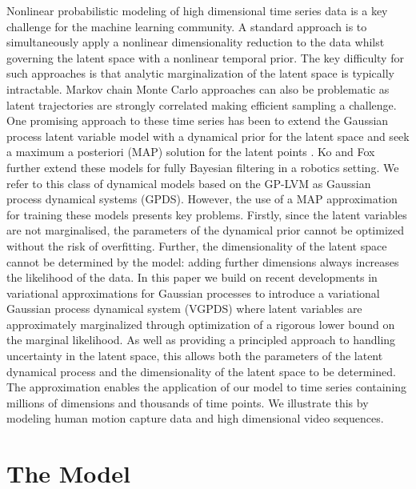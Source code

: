 \documentclass{article} %
\begin{document}
Nonlinear probabilistic modeling of high dimensional time series data
is a key challenge for the machine learning community. A standard
approach is to simultaneously apply a nonlinear dimensionality
reduction to the data whilst governing the latent space with a
nonlinear temporal prior. The key difficulty for such approaches is
that analytic marginalization of the latent space is typically
intractable. Markov chain Monte Carlo approaches can also be
problematic as latent trajectories are strongly correlated making
efficient sampling a challenge. One promising approach to these time
series has been to extend the Gaussian process latent variable model
\cite{GPLVM,GPLVM2} with a dynamical prior for the latent space and
seek a maximum a posteriori (MAP) solution for the latent points
\cite{GPDM,Wang:gpdm08,hgplvm}. Ko and Fox \cite{GP-Based} further extend these
models for fully Bayesian filtering in a robotics setting. We refer to
this class of dynamical models based on the GP-LVM as Gaussian process
dynamical systems (GPDS). However, the use of a MAP approximation for
training these models presents key problems.  Firstly, since the
latent variables are not marginalised, the parameters of the dynamical
prior cannot be optimized without the risk of overfitting.
Further, the dimensionality of the latent space cannot be determined
by the model: adding further dimensions always increases the
likelihood of the data. In this paper we build on recent developments
in variational approximations for Gaussian processes
\cite{Titsias09,BayesianGPLVM} to introduce a variational Gaussian
process dynamical system (VGPDS) where latent variables are
approximately marginalized through optimization of a rigorous lower
bound on the marginal likelihood.  As well as providing a principled
approach to handling uncertainty in the latent space, this allows both
the parameters of the latent dynamical process and the dimensionality
of the latent space to be determined. The approximation enables the
application of our model to time series containing millions of
dimensions and thousands of time points. We illustrate this by
modeling human motion capture data and high dimensional video
sequences.



\section{The Model} 
\end{document}
